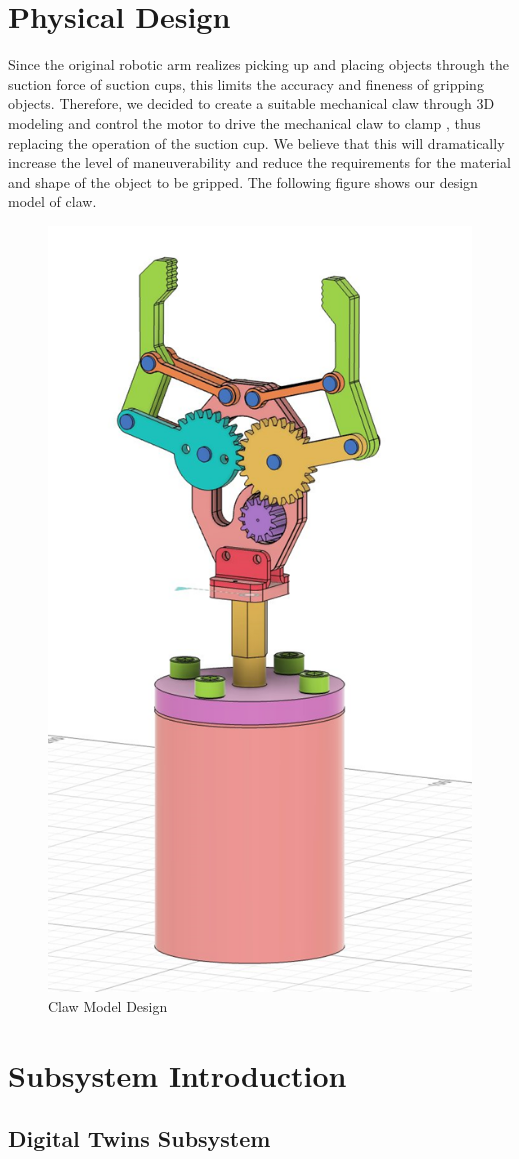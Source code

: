 \documentclass{senior-design}
\begin{document}
\section{Physical Design}
Since the original robotic arm realizes picking up and placing objects through 
the suction force of suction cups, this limits the accuracy and fineness of 
gripping objects. Therefore, we decided to create a suitable mechanical claw 
through 3D modeling and control the motor to drive the mechanical claw to clamp
, thus replacing the operation of the suction cup. We believe that this will 
dramatically increase the level of maneuverability and reduce the requirements 
for the material and shape of the object to be gripped. The following figure shows
our design model of claw.
\begin{figure}[H]
    \centering
    \includegraphics[width=0.6\linewidth]{Claw.png}
    \caption{Claw Model Design}
\end{figure}
\section{Subsystem Introduction}
\subsection{Digital Twins Subsystem}
\end{document}

